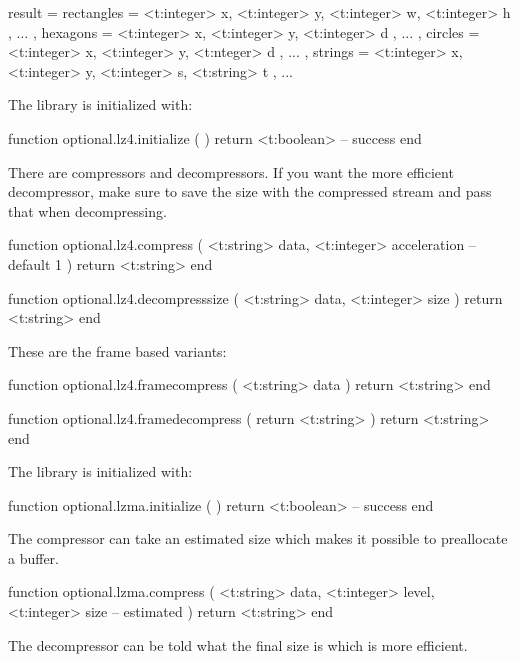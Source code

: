 \starttyping[option=LUA]
result = {
    rectangles = {
        { <t:integer> x, <t:integer> y, <t:integer> w, <t:integer> h }, ...
    },
    hexagons = {
        { <t:integer> x, <t:integer> y, <t:integer> d }, ...
    },
    circles = {
        { <t:integer> x, <t:integer> y, <t:nteger> d }, ...
    },
    strings = {
        { <t:integer> x, <t:integer> y, <t:integer> s, <t:string> t }, ...
    }
}
\stoptyping

\stopsubsubsubject

\stopsubsection

\startsubsection[title=Compression]

\startsubsubsubject[title=lz4]

The library is initialized with:

\starttyping[option=LUA]
function optional.lz4.initialize ( )
    return <t:boolean> -- success
end
\stoptyping

There are compressors and decompressors. If you want the more efficient
decompressor, make sure to save the size with the compressed stream and pass that
when decompressing.

\starttyping[option=LUA]
function optional.lz4.compress (
    <t:string>  data,
    <t:integer> acceleration -- default 1
)
    return <t:string>
end

function optional.lz4.decompresssize (
    <t:string>  data,
    <t:integer> size
)
    return <t:string>
end
\stoptyping

These are the frame based variants:

\starttyping[option=LUA]
function optional.lz4.framecompress ( <t:string> data )
    return <t:string>
end

function optional.lz4.framedecompress ( return <t:string>  )
    return <t:string>
end
\stoptyping

\stopsubsubsubject

\startsubsubsubject[title=lzma]

The library is initialized with:

\starttyping[option=LUA]
function optional.lzma.initialize ( )
    return <t:boolean> -- success
end
\stoptyping

The compressor can take an estimated size which makes it possible to preallocate
a buffer.

\starttyping[option=LUA]
function optional.lzma.compress (
    <t:string>  data,
    <t:integer> level,
    <t:integer> size   -- estimated
)
    return <t:string>
end
\stoptyping

The decompressor can be told what the final size is which is more efficient.

